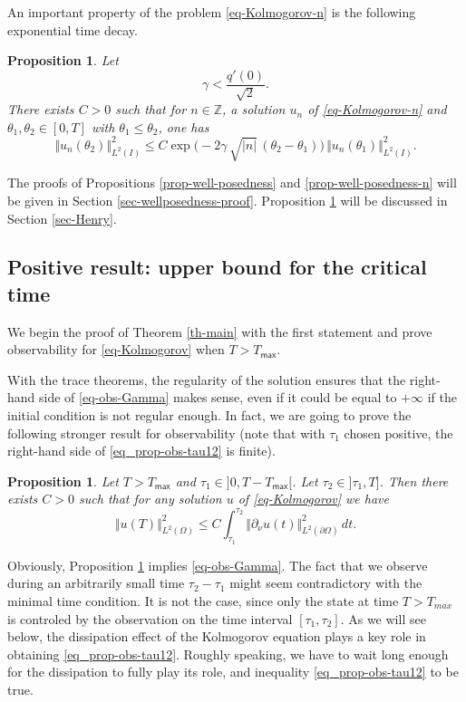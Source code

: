 \documentclass[11pt]{article}
\numberwithin{equation}{section}
\theoremstyle{plain}
\newtheorem{proposition}[theorem]{Proposition}
\theoremstyle{definition}
\newcommand{\abs}[1]{\vert #1\vert}
\newcommand{\nr}[1]{\Vert #1\Vert}
\newcommand{\1}{\mathds 1}
\newcommand{\Z}{\mathbb{Z}}
\let\th\theta
\let\O\Omega
\newcommand{\Tmax}{T_{\mathsf{max}}}
\begin{document}
An important property of the problem \eqref{eq-Kolmogorov-n} is the following exponential time decay.

\begin{proposition} \label{prop-decay-expKn}
Let
\[
\gamma < \frac{q'(0)}{\sqrt{2}}.
\]
There exists $C>0$ such that for $n \in \Z$, a solution $u_n$ of \eqref{eq-Kolmogorov-n} and $\th_1,\th_2 \in [0,T]$ with $\th_1 \leq \th_2$, one has
\[
\nr{u_n(\th_2)}_{L^2(I)}^2 \leq C \exp \bigl(- 2 \gamma\,\sqrt{\abs n}\,(\th_2-\th_1)\bigr)\, \nr{u_n(\th_1)}_{L^2(I)}^2.
\]
\end{proposition}

The proofs of Propositions \ref{prop-well-posedness} and \ref{prop-well-posedness-n} will be given in Section \ref{sec-wellposedness-proof}. Proposition \ref{prop-decay-expKn} will be discussed in Section \ref{sec-Henry}.

\subsection{Positive result: upper bound for the critical time}

We begin the proof of Theorem \ref{th-main} with the first statement and prove observability for \eqref{eq-Kolmogorov} when $T > \Tmax$.

With the trace theorems, the regularity of the solution ensures that the right-hand side of \eqref{eq-obs-Gamma} makes sense, even if it could be equal to $+\infty$ if the initial condition is not regular enough. In fact, we are going to prove the following stronger result for observability (note that with $\tau_1$ chosen positive, the right-hand side of \eqref{eq_prop-obs-tau12} is finite).

\begin{proposition} \label{prop-obs-tau12}
Let $T > \Tmax$ and $\tau_1 \in{}]0,T-\Tmax[$. Let $\tau_2 \in{}]\tau_1,T]$. Then there exists $C > 0$ such that for any solution $u$ of \eqref{eq-Kolmogorov} we have
\begin{equation} \label{eq_prop-obs-tau12}
\nr{u(T)}_{L^2(\O)}^2 \leq C \int_{\tau_1}^{\tau_2} \nr{\partial_\nu u(t)}_{L^2(\partial \O)}^2 \, dt.
\end{equation}
\end{proposition}

Obviously, Proposition \ref{prop-obs-tau12} implies \eqref{eq-obs-Gamma}. The fact that we observe during an arbitrarily small time $\tau_2 - \tau_1$ might seem contradictory with the minimal time condition. It is not the case, since only the state at time $T>T_{max}$ is controled by the observation on the
time interval $[\tau_1,\tau_2]$. As we will see below, the dissipation effect of the Kolmogorov equation plays a key role in obtaining \eqref{eq_prop-obs-tau12}. Roughly speaking, we have to wait long enough for the dissipation to fully play its role, and
inequality \eqref{eq_prop-obs-tau12} to be true.
\end{document}
